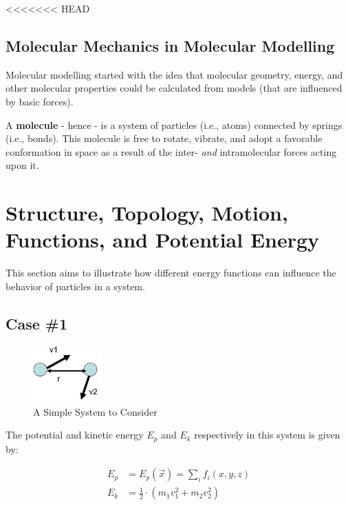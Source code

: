 \documentclass[
  letterpaper,
  DIV=11,
  numbers=noendperiod]{scrreprt}
\begin{document}
<<<<<<< HEAD
\hypertarget{molecular-mechanics-in-molecular-modelling}{%
\subsection{Molecular Mechanics in Molecular
Modelling}\label{molecular-mechanics-in-molecular-modelling}}

Molecular modelling started with the idea that molecular geometry,
energy, and other molecular properties could be calculated from models
(that are influenced by basic forces).

A \textbf{molecule} - hence - is a system of particles (i.e., atoms)
connected by springs (i.e., bonds). This molecule is free to rotate,
vibrate, and adopt a favorable conformation in space as a result of the
inter- \emph{and} intramolecular forces acting upon it.

\hypertarget{structure-topology-motion-functions-and-potential-energy}{%
\section{Structure, Topology, Motion, Functions, and Potential
Energy}\label{structure-topology-motion-functions-and-potential-energy}}

This section aims to illustrate how different energy functions can
influence the behavior of particles in a system.

\hypertarget{case-1}{%
\subsection{Case \#1}\label{case-1}}

\begin{figure}

{\centering \includegraphics[width=1.04in,height=\textheight]{./images/wk1/system.jpg}

}

\caption{A Simple System to Consider}

\end{figure}

The potential and kinetic energy \(E_p\) and \(E_k\) respectively in
this system is given by:

\begin{align}
  E_p &= E_p(\vec{x}) = \sum_{i}f_i(x, y, z) \\ 
  E_k &= \frac{1}{2} \cdot (m_1v_1^2 + m_2v_2^2) 
\end{align}
\end{document}
